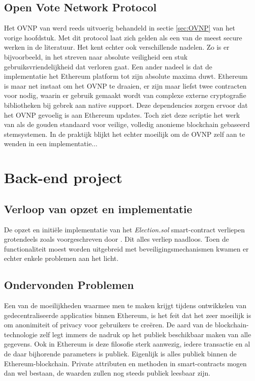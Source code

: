 	\subsection{Open Vote Network Protocol}
	Het OVNP van \textcite{McCorry2017} werd reeds uitvoerig behandeld in sectie \ref{sec:OVNP} van het vorige hoofdstuk. Met dit protocol laat \textcite{McCorry2017} zich gelden als een van de meest secure werken in de literatuur. Het kent echter ook verschillende nadelen. Zo is er bijvoorbeeld, in het streven naar absolute veiligheid een stuk gebruiksvriendelijkheid dat verloren gaat. Een ander nadeel is dat de implementatie het Ethereum platform tot zijn absolute maxima duwt. Ethereum is maar net instaat om het OVNP te draaien, er zijn maar liefst twee contracten voor nodig, waarin er gebruik  gemaakt wordt van complexe externe cryptografie bibliotheken bij gebrek aan native support. Deze dependencies zorgen ervoor dat het OVNP gevoelig is aan Ethereum updates. Toch ziet deze scriptie het werk van \textcite{McCorry2017} als de gouden standaard voor veilige, volledig anonieme blockchain gebaseerd stemsystemen. In de praktijk blijkt het echter moeilijk om de OVNP zelf aan te wenden in een implementatie...
	
\section{Back-end project}
	\subsection{Verloop van opzet en implementatie}
	De opzet en initiële implementatie van het \textit{Election.sol} smart-contract verliepen grotendeels zoals voorgeschreven door \textcite{McCubin2019}. Dit alles verliep naadloos. Toen de functionaliteit moest worden uitgebreid met beveiligingsmechanismen kwamen er echter enkele problemen aan het licht.
	
	\subsection{Ondervonden Problemen}
	Een van de moeilijkheden waarmee men te maken krijgt tijdens ontwikkelen van gedecentraliseerde applicaties binnen Ethereum, is het feit dat het zeer moeilijk is om anonimiteit of privacy voor gebruikers te creëren. De aard van de blockchain-technologie zelf legt immers de nadruk op het publiek beschikbaar maken van alle gegevens. Ook in Ethereum is deze filosofie sterk aanwezig, iedere transactie en al de daar bijhorende parameters is publiek. Eigenlijk is alles publiek binnen de Ethereum-blockchain. Private attributen en methoden in smart-contracts mogen dan wel bestaan, de waarden zullen nog steeds publiek leesbaar zijn. \autocite{Buterin2014}
	

